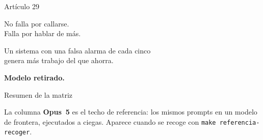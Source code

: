 \documentclass[aspectratio=169,11pt]{beamer}
\begin{document}
\begin{frame}{Artículo 29}
  \begin{center}
    \Large No falla por callarse.\\[.4em]
    \Large \alert{Falla por hablar de más.}
  \end{center}
  \vspace{1.5em}
  \begin{center}
    Un sistema con una falsa alarma de cada cinco\\
    genera más trabajo del que ahorra.
  \end{center}
  \vspace{1em}
  \begin{center}\textbf{Modelo retirado.}\end{center}
\end{frame}

\begin{frame}{Resumen de la matriz}
  \centering\small

  \vspace{.8em}
  {\footnotesize La columna \textbf{Opus~5} es el techo de referencia: los
  mismos prompts en un modelo de frontera, ejecutados a ciegas. Aparece cuando
  se recoge con \texttt{make referencia-recoger}.\par}
\end{frame}
\end{document}
